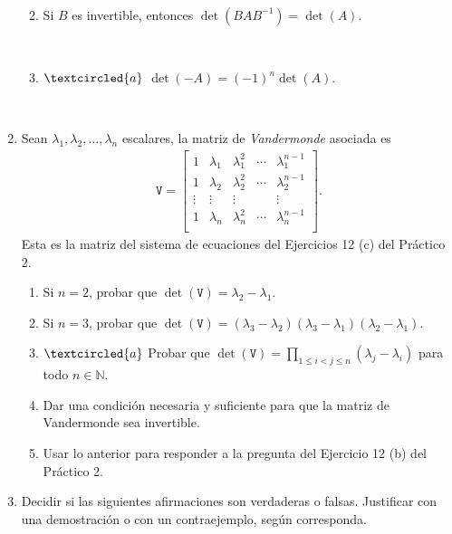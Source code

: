 \documentclass[a4paper,12pt,twoside,spanish,reqno]{amsbook}
\numberwithin{equation}{section}
\begin{document}
\begin{enumerate}
\begin{enumerate}
	\
	
	\item Si $B$ es invertible, entonces $\det(B A B^{-1}) = \det (A)$.
	
	\
	
		\item\label{-A} $\textcircled{a}$ $\det(-A) = (-1)^n\det (A)$.
\end{enumerate}

\

\item\label{vandermonde} Sean $\lambda_1, \lambda_2, \dots, \lambda_n$ escalares, la matriz de \emph{Vandermonde} asociada es
\begin{align*}
\mathtt V = \begin{bmatrix}
1 & \lambda_1 & \lambda_1^2 & \cdots & \lambda_1^{n-1}\\
1 & \lambda_2 & \lambda_2^2 & \cdots & \lambda_2^{n-1}\\
\vdots &\vdots &\vdots & &\vdots\\
1 & \lambda_n & \lambda_n^2 & \cdots & \lambda_n^{n-1}\\
\end{bmatrix}.
\end{align*}
Esta es la matriz del sistema de ecuaciones del Ejercicios 12 (c) del Práctico 2.


\begin{enumerate}
\item Si $n=2$, probar que $\det(\mathtt V) = \lambda_2-\lambda_1$.


\item Si $n=3$, probar que $\det(\mathtt V) = (\lambda_3-\lambda_2) (\lambda_3-\lambda_1) (\lambda_2-\lambda_1)$.


\item\label{vandermonde gral} $\textcircled{a}$ Probar que $\det(\mathtt V) = \prod_{1\leq i< j \leq n}(\lambda_j-\lambda_i)$ para todo $n\in\mathbb{N}$.


\item Dar una condición necesaria y suficiente para que la matriz de Vandermonde sea invertible.


\item Usar lo anterior para responder a la pregunta del Ejercicio 12 (b) del Práctico 2.
\end{enumerate}


\item Decidir si las siguientes afirmaciones son verdaderas o falsas. Justificar con una demostración o con un contraejemplo, según corresponda.



\end{enumerate}
\end{document}
